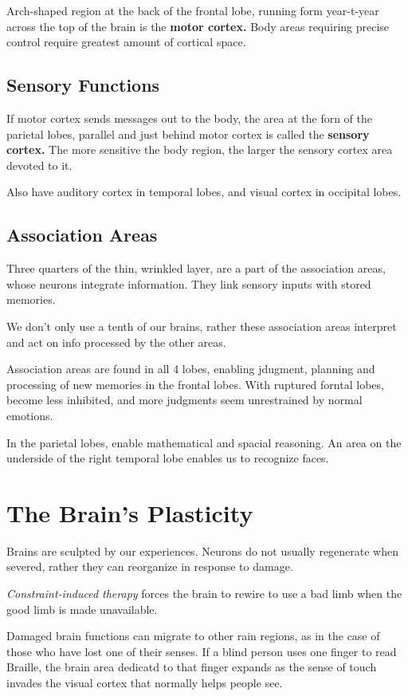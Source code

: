 Arch-shaped region at the back of the frontal lobe, running form year-t-year across the top of the brain is the \textbf{motor cortex.} Body areas requiring precise control require greatest amount of cortical space.

\subsection*{Sensory Functions}

If motor cortex sends messages out to the body, the area at the forn of the parietal lobes, parallel and just behind motor cortex is called the \textbf{sensory cortex.} The more sensitive the body region, the larger the sensory cortex area devoted to it. 

Also have auditory cortex in temporal lobes, and visual cortex in occipital lobes. 

\subsection*{Association Areas}
Three quarters of the thin, wrinkled layer, are a part of the association areas, whose neurons integrate information. They link sensory inputs with stored memories.

We don't only use a tenth of our brains, rather these association areas interpret and act on info processed by the other areas.

Association areas are found in all 4 lobes, enabling jdugment, planning and processing of new memories in the frontal lobes. With ruptured forntal lobes, become less inhibited, and more judgments seem unrestrained by normal emotions. 

In the parietal lobes, enable mathematical and spacial reasoning. An area on the underside of the right temporal lobe enables us to recognize faces. 

\section*{The Brain's Plasticity}
Brains are sculpted by our experiences. Neurons do not usually regenerate when severed, rather they can reorganize in response to damage.

\textit{Constraint-induced therapy} forces the brain to rewire to use a bad limb when the good limb is made unavailable.

Damaged brain functions can migrate to other rain regions, as in the case of those who have lost one of their senses. If a blind person uses one finger to read Braille, the brain area dedicatd to that finger expands as the sense of touch invades the visual cortex that normally helps people see. 

